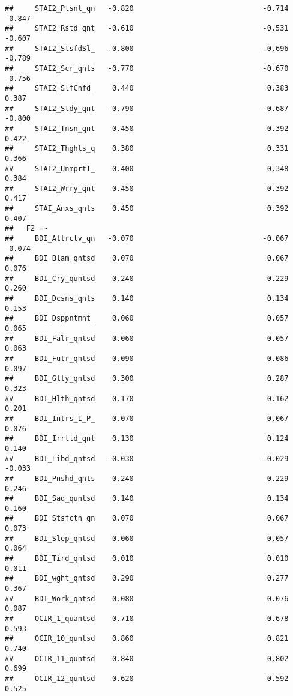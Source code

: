 \documentclass[]{article}
\begin{document}
\begin{verbatim}
##     STAI2_Plsnt_qn   -0.820                              -0.714   -0.847
##     STAI2_Rstd_qnt   -0.610                              -0.531   -0.607
##     STAI2_StsfdSl_   -0.800                              -0.696   -0.789
##     STAI2_Scr_qnts   -0.770                              -0.670   -0.756
##     STAI2_SlfCnfd_    0.440                               0.383    0.387
##     STAI2_Stdy_qnt   -0.790                              -0.687   -0.800
##     STAI2_Tnsn_qnt    0.450                               0.392    0.422
##     STAI2_Thghts_q    0.380                               0.331    0.366
##     STAI2_UnmprtT_    0.400                               0.348    0.384
##     STAI2_Wrry_qnt    0.450                               0.392    0.417
##     STAI_Anxs_qnts    0.450                               0.392    0.407
##   F2 =~                                                                 
##     BDI_Attrctv_qn   -0.070                              -0.067   -0.074
##     BDI_Blam_qntsd    0.070                               0.067    0.076
##     BDI_Cry_quntsd    0.240                               0.229    0.260
##     BDI_Dcsns_qnts    0.140                               0.134    0.153
##     BDI_Dsppntmnt_    0.060                               0.057    0.065
##     BDI_Falr_qntsd    0.060                               0.057    0.063
##     BDI_Futr_qntsd    0.090                               0.086    0.097
##     BDI_Glty_qntsd    0.300                               0.287    0.323
##     BDI_Hlth_qntsd    0.170                               0.162    0.201
##     BDI_Intrs_I_P_    0.070                               0.067    0.076
##     BDI_Irrttd_qnt    0.130                               0.124    0.140
##     BDI_Libd_qntsd   -0.030                              -0.029   -0.033
##     BDI_Pnshd_qnts    0.240                               0.229    0.246
##     BDI_Sad_quntsd    0.140                               0.134    0.160
##     BDI_Stsfctn_qn    0.070                               0.067    0.073
##     BDI_Slep_qntsd    0.060                               0.057    0.064
##     BDI_Tird_qntsd    0.010                               0.010    0.011
##     BDI_wght_qntsd    0.290                               0.277    0.367
##     BDI_Work_qntsd    0.080                               0.076    0.087
##     OCIR_1_quantsd    0.710                               0.678    0.593
##     OCIR_10_quntsd    0.860                               0.821    0.740
##     OCIR_11_quntsd    0.840                               0.802    0.699
##     OCIR_12_quntsd    0.620                               0.592    0.525

\end{verbatim}
\end{document}
